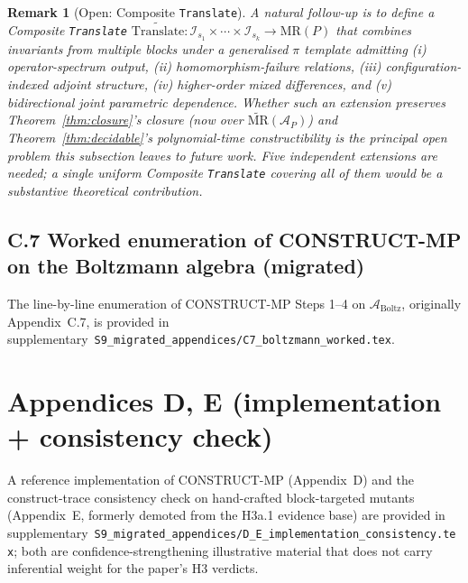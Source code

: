 \documentclass[manuscript]{acmart}
\newtheorem{remark}{Remark}
\begin{document}
\begin{remark}[Open: Composite \texttt{Translate}]
\label{rem:composite-translate}
A natural follow-up is to define a \emph{Composite \texttt{Translate}} $\widetilde{\mathrm{Translate}}: \mathcal{I}_{s_{1}} \times \cdots \times \mathcal{I}_{s_{k}} \to \mathrm{MR}(P)$ that combines invariants from multiple blocks under a generalised $\pi$ template admitting (i) operator-spectrum output, (ii) homomorphism-failure relations, (iii) configuration-indexed adjoint structure, (iv) higher-order mixed differences, and (v) bidirectional joint parametric dependence. Whether such an extension preserves Theorem~\ref{thm:closure}'s closure (now over $\widetilde{\mathrm{MR}}(\mathcal{A}_{P})$) and Theorem~\ref{thm:decidable}'s polynomial-time constructibility is the principal open problem this subsection leaves to future work. Five independent extensions are needed; a single uniform Composite \texttt{Translate} covering all of them would be a substantive theoretical contribution.
\end{remark}

\subsection*{C.7 Worked enumeration of CONSTRUCT-MP on the Boltzmann algebra (migrated)}
\label{app:moved-C7}
The line-by-line enumeration of CONSTRUCT-MP Steps 1--4 on $\mathcal{A}_{\mathrm{Boltz}}$, originally Appendix~C.7, is provided in supplementary~\texttt{S9\_migrated\_appendices/C7\_boltzmann\_worked.tex}.

\section*{Appendices D, E (implementation + consistency check)}
\label{app:moved-D-E}
A reference implementation of CONSTRUCT-MP (Appendix~D) and the construct-trace consistency check on hand-crafted block-targeted mutants (Appendix~E, formerly demoted from the H3a.1 evidence base) are provided in supplementary~\texttt{S9\_migrated\_appendices/D\_E\_implementation\_consistency.tex}; both are confidence-strengthening illustrative material that does not carry inferential weight for the paper's H3 verdicts.
\end{document}
